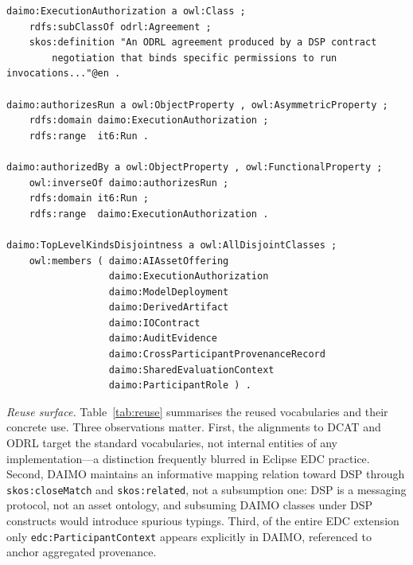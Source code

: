 \documentclass[Afour,sagev,times]{sagej}
\newcommand{\code}[1]{\texttt{#1}}
\begin{document}
\begin{lstlisting}[label=lst:axioms,caption={Core axioms around \code{ExecutionAuthorization}.}]
daimo:ExecutionAuthorization a owl:Class ;
    rdfs:subClassOf odrl:Agreement ;
    skos:definition "An ODRL agreement produced by a DSP contract
        negotiation that binds specific permissions to run invocations..."@en .

daimo:authorizesRun a owl:ObjectProperty , owl:AsymmetricProperty ;
    rdfs:domain daimo:ExecutionAuthorization ;
    rdfs:range  it6:Run .

daimo:authorizedBy a owl:ObjectProperty , owl:FunctionalProperty ;
    owl:inverseOf daimo:authorizesRun ;
    rdfs:domain it6:Run ;
    rdfs:range  daimo:ExecutionAuthorization .

daimo:TopLevelKindsDisjointness a owl:AllDisjointClasses ;
    owl:members ( daimo:AIAssetOffering
                  daimo:ExecutionAuthorization
                  daimo:ModelDeployment
                  daimo:DerivedArtifact
                  daimo:IOContract
                  daimo:AuditEvidence
                  daimo:CrossParticipantProvenanceRecord
                  daimo:SharedEvaluationContext
                  daimo:ParticipantRole ) .
\end{lstlisting}

\medskip\noindent\emph{Reuse surface.}\label{sec:reuse}
Table~\ref{tab:reuse} summarises the reused vocabularies and their concrete use. Three observations matter. First, the alignments to DCAT and ODRL target the standard vocabularies, not internal entities of any implementation---a distinction frequently blurred in Eclipse EDC practice. Second, DAIMO maintains an informative mapping relation toward DSP through \code{skos:closeMatch} and \code{skos:related}, not a subsumption one: DSP is a messaging protocol, not an asset ontology, and subsuming DAIMO classes under DSP constructs would introduce spurious typings. Third, of the entire EDC extension only \code{edc:ParticipantContext} appears explicitly in DAIMO, referenced to anchor aggregated provenance.
\end{document}
